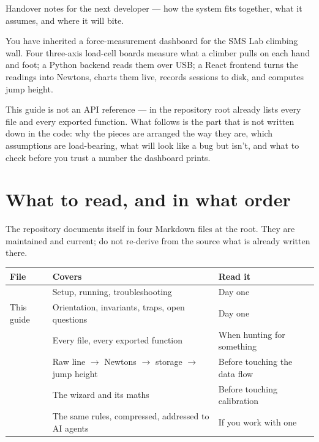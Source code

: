\documentclass[11pt,a4paper]{article}
\begin{document}
%
  {Handover notes for the next developer --- how the system fits together,
   what it assumes, and where it will bite.}

You have inherited a force-measurement dashboard for the SMS Lab climbing wall.
Four three-axis load-cell boards measure what a climber pulls on each hand and
foot; a Python backend reads them over USB; a React frontend turns the readings
into Newtons, charts them live, records sessions to disk, and computes jump
height.

This guide is not an API reference ---  in the repository
root already lists every file and every exported function. What follows is the
part that is not written down in the code: why the pieces are arranged the way
they are, which assumptions are load-bearing, what will look like a bug but
isn't, and what to check before you trust a number the dashboard prints.

\section{What to read, and in what order}

The repository documents itself in four Markdown files at the root. They are
maintained and current; do not re-derive from the source what is already
written there.

\begin{center}
\begin{tabular}{@{}L{4.6cm}L{6.3cm}L{4.6cm}@{}}
\toprule
\textbf{File} & \textbf{Covers} & \textbf{Read it} \\
\midrule
{} & Setup, running, troubleshooting & Day one \\
This guide & Orientation, invariants, traps, open questions & Day one \\
 & Every file, every exported function & When hunting for something \\
 & Raw line $\rightarrow$ Newtons $\rightarrow$ storage $\rightarrow$ jump height & Before touching the data flow \\
 & The wizard and its maths & Before touching calibration \\
 & The same rules, compressed, addressed to AI agents & If you work with one \\
\bottomrule
\end{tabular}
\end{center}
\end{document}
